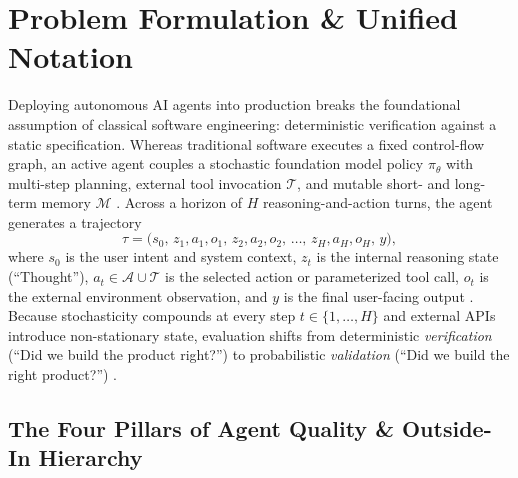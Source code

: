 \documentclass[../../../../master.tex]{subfiles}
\begin{document}

\section{Problem Formulation \& Unified Notation}
\label{sec:ops:formulation}

Deploying autonomous AI agents into production breaks the foundational assumption of classical software engineering: deterministic verification against a static specification. Whereas traditional software executes a fixed control-flow graph, an active agent couples a stochastic foundation model policy $\pi_\theta$ with multi-step planning, external tool invocation $\mathcal{T}$, and mutable short- and long-term memory $\mathcal{M}$ . Across a horizon of $H$ reasoning-and-action turns, the agent generates a trajectory
\begin{equation}
  \tau = \bigl(s_0,\, z_1, a_1, o_1,\, z_2, a_2, o_2,\, \dots,\, z_H, a_H, o_H,\, y\bigr),
  \label{eq:ops:trajectory}
\end{equation}
where $s_0$ is the user intent and system context, $z_t$ is the internal reasoning state (``Thought''), $a_t \in \mathcal{A} \cup \mathcal{T}$ is the selected action or parameterized tool call, $o_t$ is the external environment observation, and $y$ is the final user-facing output . Because stochasticity compounds at every step $t \in \{1,\dots,H\}$ and external APIs introduce non-stationary state, evaluation shifts from deterministic \emph{verification} (``Did we build the product right?'') to probabilistic \emph{validation} (``Did we build the right product?'') .

\subsection{The Four Pillars of Agent Quality \& Outside-In Hierarchy}
\label{sec:ops:pillars}
\end{document}
